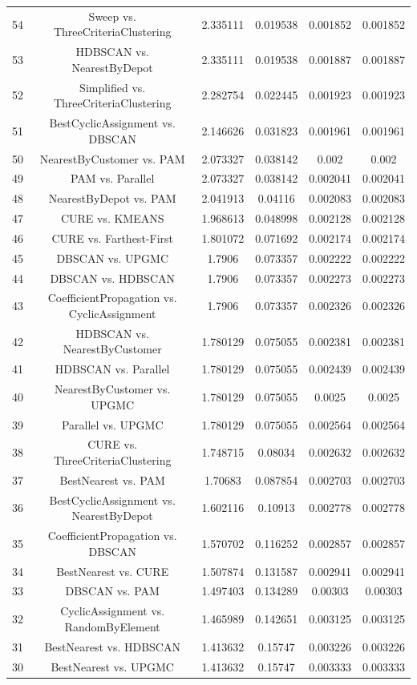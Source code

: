 \documentclass[a4paper,10pt]{article}
\begin{document}
\begin{landscape}
\begin{table}[!htp]
\begin{tabular}{cccccc}
54&Sweep vs. ThreeCriteriaClustering&2.335111&0.019538&0.001852&0.001852\\
53&HDBSCAN vs. NearestByDepot&2.335111&0.019538&0.001887&0.001887\\
52&Simplified vs. ThreeCriteriaClustering&2.282754&0.022445&0.001923&0.001923\\
51&BestCyclicAssignment vs. DBSCAN&2.146626&0.031823&0.001961&0.001961\\
50&NearestByCustomer vs. PAM&2.073327&0.038142&0.002&0.002\\
49&PAM vs. Parallel&2.073327&0.038142&0.002041&0.002041\\
48&NearestByDepot vs. PAM&2.041913&0.04116&0.002083&0.002083\\
47&CURE vs. KMEANS&1.968613&0.048998&0.002128&0.002128\\
46&CURE vs. Farthest-First&1.801072&0.071692&0.002174&0.002174\\
45&DBSCAN vs. UPGMC&1.7906&0.073357&0.002222&0.002222\\
44&DBSCAN vs. HDBSCAN&1.7906&0.073357&0.002273&0.002273\\
43&CoefficientPropagation vs. CyclicAssignment&1.7906&0.073357&0.002326&0.002326\\
42&HDBSCAN vs. NearestByCustomer&1.780129&0.075055&0.002381&0.002381\\
41&HDBSCAN vs. Parallel&1.780129&0.075055&0.002439&0.002439\\
40&NearestByCustomer vs. UPGMC&1.780129&0.075055&0.0025&0.0025\\
39&Parallel vs. UPGMC&1.780129&0.075055&0.002564&0.002564\\
38&CURE vs. ThreeCriteriaClustering&1.748715&0.08034&0.002632&0.002632\\
37&BestNearest vs. PAM&1.70683&0.087854&0.002703&0.002703\\
36&BestCyclicAssignment vs. NearestByDepot&1.602116&0.10913&0.002778&0.002778\\
35&CoefficientPropagation vs. DBSCAN&1.570702&0.116252&0.002857&0.002857\\
34&BestNearest vs. CURE&1.507874&0.131587&0.002941&0.002941\\
33&DBSCAN vs. PAM&1.497403&0.134289&0.00303&0.00303\\
32&CyclicAssignment vs. RandomByElement&1.465989&0.142651&0.003125&0.003125\\
31&BestNearest vs. HDBSCAN&1.413632&0.15747&0.003226&0.003226\\
30&BestNearest vs. UPGMC&1.413632&0.15747&0.003333&0.003333\\

\end{tabular}
\end{table}
\end{landscape}
\end{document}
